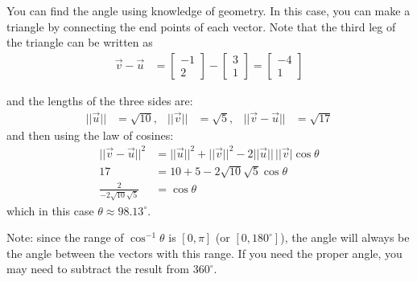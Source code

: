 You can find the angle using knowledge of geometry.  In this case, you can make a triangle by connecting the end points of each vector.  Note that the third leg of the triangle can be written as
%
\begin{align*}
\vec{v}-\vec{u} & = \begin{bmatrix}
-1 \\ 2
\end{bmatrix} - \begin{bmatrix}
3 \\ 1
\end{bmatrix} = \begin{bmatrix}
-4 \\ 1
\end{bmatrix}
\end{align*}


\begin{center}
\end{center}
and the lengths of the three sides are:
%
\begin{align*}
||\vec{u}|| & = \sqrt{10}, & ||\vec{v}|| &= \sqrt{5}, & ||\vec{v}-\vec{u}|| & = \sqrt{17} 
\end{align*}
and then using the law of cosines:
%
\begin{align*}
||\vec{v}-\vec{u}||^2 & = ||\vec{u}||^2 + || \vec{v}||^2 -2 ||\vec{u}|| \,  ||\vec{v}| \cos \theta \\
17 & = 10+5 - 2 \sqrt{10}\sqrt{5} \cos \theta \\
\frac{2}{-2 \sqrt{10}\sqrt{5}} & = \cos \theta 
\end{align*}
which in this case $\theta \approx 98.13^{\circ}$.  


Note: since the range of $\cos^{-1} \theta$ is $[0,\pi]$ (or $[0,180^{\circ}]$), the angle will always be the angle between the vectors with this range.  If you need the proper angle, you may need to subtract the result from $360^{\circ}$.  



